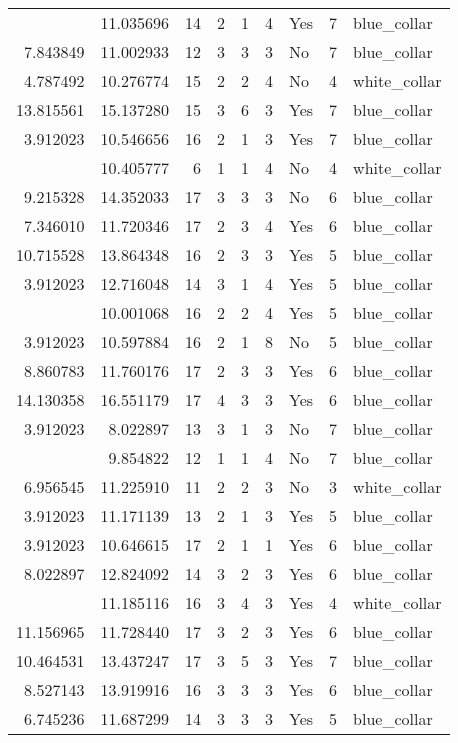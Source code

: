 \documentclass[
]{article}
\begin{document}
\begin{longtable}[t]{rrrrrllrl}
\addlinespace
3.912023 & 11.035696 & 14 & 2 & 1 & 4 & Yes & 7 & blue\_collar\\
7.843849 & 11.002933 & 12 & 3 & 3 & 3 & No & 7 & blue\_collar\\
4.787492 & 10.276774 & 15 & 2 & 2 & 4 & No & 4 & white\_collar\\
13.815561 & 15.137280 & 15 & 3 & 6 & 3 & Yes & 7 & blue\_collar\\
3.912023 & 10.546656 & 16 & 2 & 1 & 3 & Yes & 7 & blue\_collar\\
\addlinespace
3.912023 & 10.405777 & 6 & 1 & 1 & 4 & No & 4 & white\_collar\\
9.215328 & 14.352033 & 17 & 3 & 3 & 3 & No & 6 & blue\_collar\\
7.346010 & 11.720346 & 17 & 2 & 3 & 4 & Yes & 6 & blue\_collar\\
10.715528 & 13.864348 & 16 & 2 & 3 & 3 & Yes & 5 & blue\_collar\\
3.912023 & 12.716048 & 14 & 3 & 1 & 4 & Yes & 5 & blue\_collar\\
\addlinespace
7.625595 & 10.001068 & 16 & 2 & 2 & 4 & Yes & 5 & blue\_collar\\
3.912023 & 10.597884 & 16 & 2 & 1 & 8 & No & 5 & blue\_collar\\
8.860783 & 11.760176 & 17 & 2 & 3 & 3 & Yes & 6 & blue\_collar\\
14.130358 & 16.551179 & 17 & 4 & 3 & 3 & Yes & 6 & blue\_collar\\
3.912023 & 8.022897 & 13 & 3 & 1 & 3 & No & 7 & blue\_collar\\
\addlinespace
3.912023 & 9.854822 & 12 & 1 & 1 & 4 & No & 7 & blue\_collar\\
6.956545 & 11.225910 & 11 & 2 & 2 & 3 & No & 3 & white\_collar\\
3.912023 & 11.171139 & 13 & 2 & 1 & 3 & Yes & 5 & blue\_collar\\
3.912023 & 10.646615 & 17 & 2 & 1 & 1 & Yes & 6 & blue\_collar\\
8.022897 & 12.824092 & 14 & 3 & 2 & 3 & Yes & 6 & blue\_collar\\
\addlinespace
8.174703 & 11.185116 & 16 & 3 & 4 & 3 & Yes & 4 & white\_collar\\
11.156965 & 11.728440 & 17 & 3 & 2 & 3 & Yes & 6 & blue\_collar\\
10.464531 & 13.437247 & 17 & 3 & 5 & 3 & Yes & 7 & blue\_collar\\
8.527143 & 13.919916 & 16 & 3 & 3 & 3 & Yes & 6 & blue\_collar\\
6.745236 & 11.687299 & 14 & 3 & 3 & 3 & Yes & 5 & blue\_collar\\

\end{longtable}
\end{document}
